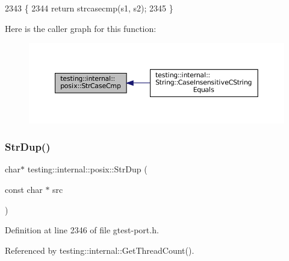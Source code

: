 \begin{DoxyCode}
2343                                                       \{
2344   \textcolor{keywordflow}{return} strcasecmp(s1, s2);
2345 \}
\end{DoxyCode}
Here is the caller graph for this function\+:
\nopagebreak
\begin{figure}[H]
\begin{center}
\leavevmode
\includegraphics[width=350pt]{namespacetesting_1_1internal_1_1posix_a1ef2385a7f8e4c706054da35967e76bd_icgraph}
\end{center}
\end{figure}
\mbox{\label{namespacetesting_1_1internal_1_1posix_a8e352884793a65ae8be144676f1a9136}} 
\subsubsection{\texorpdfstring{Str\+Dup()}{StrDup()}}
{\footnotesize\ttfamily char$\ast$ testing\+::internal\+::posix\+::\+Str\+Dup (\begin{DoxyParamCaption}\item[{const char $\ast$}]{src }\end{DoxyParamCaption})\hspace{0.3cm}{\ttfamily [inline]}}



Definition at line 2346 of file gtest-\/port.\+h.



Referenced by testing\+::internal\+::\+Get\+Thread\+Count().


